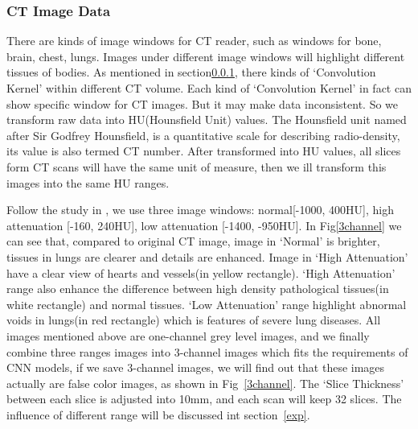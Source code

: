 \documentclass[runningheads]{llncs}
\begin{document}
\subsubsection{CT Image Data}
\label{ctimagedata}
There are kinds of image windows for CT reader, such as windows for bone, brain, chest, lungs. Images under different image windows will highlight different tissues of bodies.
As mentioned in section\ref{ctimagedata}, there kinds of `Convolution Kernel' within different CT volume. Each kind of `Convolution Kernel' in fact can show specific window for CT images. But it may make data inconsistent. So we transform raw data into HU(Hounsfield Unit) values. The Hounsfield unit named after Sir Godfrey Hounsfield, is a quantitative scale for describing radio-density, its value is also termed CT number. After transformed into HU values, all slices form CT scans will have the same unit of measure, then we ill transform this images into the same HU ranges.

Follow the study in \cite{Shin2017Three}, we use three image windows: normal[-1000, 400HU], high attenuation [-160, 240HU], low attenuation [-1400, -950HU]. In Fig\ref{3channel} we can see that, compared to original CT image, image in `Normal' is brighter, tissues in lungs are clearer and details are enhanced. Image in `High Attenuation' have a clear view of hearts and vessels(in yellow rectangle). `High Attenuation' range also enhance the difference between high density pathological tissues(in white rectangle) and normal tissues. `Low Attenuation' range highlight abnormal voids in lungs(in red rectangle) which is features of severe lung diseases. All images mentioned above are one-channel grey level images, and we finally combine three ranges images into 3-channel images which fits the requirements of CNN models, if we save 3-channel images, we will find out that these images actually are false color images, as shown in Fig~\ref{3channel}. The `Slice Thickness' between each slice is adjusted into 10mm, and each scan will keep 32 slices.
The influence of different range will be discussed int section~\ref{exp}.
\end{document}
